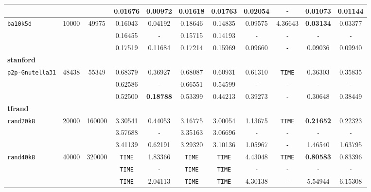 {\begin{tabular}{ l c c | c c c c c c c c }
 &  &  & 0.01676 & \textbf{0.00972} & 0.01618 & 0.01763 & 0.02054 & \verb|-| & 0.01073 & 0.01144 \\
\hline
\verb|ba10k5d| & 10000 & 49975 & 0.16043 & 0.04192 & 0.18646 & 0.14835 & 0.09575 & 4.36643 & \textbf{0.03134} & 0.03377 \\
 &  &  & 0.16455 & \verb|-| & 0.15715 & 0.14193 & \verb|-| & \verb|-| & \verb|-| & \verb|-| \\
 &  &  & 0.17519 & 0.11684 & 0.17214 & 0.15969 & 0.09660 & \verb|-| & 0.09036 & 0.09940 \\
\hline
\multicolumn{11}{l}{\textbf{stanford}} \\
\hline
\verb|p2p-Gnutella31| & 48438 & 55349 & 0.68379 & 0.36927 & 0.68087 & 0.60931 & 0.61310 & \verb|TIME| & 0.36303 & 0.35835 \\
 &  &  & 0.62586 & \verb|-| & 0.66551 & 0.54599 & \verb|-| & \verb|-| & \verb|-| & \verb|-| \\
 &  &  & 0.52500 & \textbf{0.18788} & 0.53399 & 0.44213 & 0.39273 & \verb|-| & 0.30648 & 0.38449 \\
\hline
\multicolumn{11}{l}{\textbf{tfrand}} \\
\hline
\verb|rand20k8| & 20000 & 160000 & 3.30541 & 0.44053 & 3.16775 & 3.00054 & 1.13675 & \verb|TIME| & \textbf{0.21652} & 0.22323 \\
 &  &  & 3.57688 & \verb|-| & 3.35163 & 3.06696 & \verb|-| & \verb|-| & \verb|-| & \verb|-| \\
 &  &  & 3.41139 & 0.62191 & 3.29320 & 3.10136 & 1.05967 & \verb|-| & 1.46540 & 1.63795 \\
\hline
\verb|rand40k8| & 40000 & 320000 & \verb|TIME| & 1.83366 & \verb|TIME| & \verb|TIME| & 4.43048 & \verb|TIME| & \textbf{0.80583} & 0.83396 \\
 &  &  & \verb|TIME| & \verb|-| & \verb|TIME| & \verb|TIME| & \verb|-| & \verb|-| & \verb|-| & \verb|-| \\
 &  &  & \verb|TIME| & 2.04113 & \verb|TIME| & \verb|TIME| & 4.30138 & \verb|-| & 5.54944 & 6.15308 \\
\hline
  \end{tabular}
}

